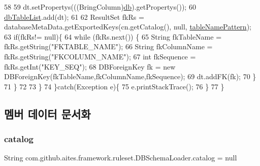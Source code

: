 \begin{DoxyCode}
58           
59                   dt.setPropertys(((BringColumn)\mbox{\hyperlink{classcom_1_1github_1_1aites_1_1framework_1_1ruleset_1_1_d_b_schema_loader_a2a610ebcfca7102369293e6728d0e9e2}{db}}).getPropertys());      
60                   \mbox{\hyperlink{classcom_1_1github_1_1aites_1_1framework_1_1ruleset_1_1_d_b_schema_loader_acacde0e67bd33c28127d235e7fb8aebf}{dbTableList}}.add(dt);
61                   
62                   ResultSet fkRs = databaseMetaData.getExportedKeys(cn.getCatalog(), null, 
      \mbox{\hyperlink{classcom_1_1github_1_1aites_1_1framework_1_1ruleset_1_1_d_b_schema_loader_a8f8b9bb76c0822247353f8e100f28a31}{tableNamePattern}});
63                   \textcolor{keywordflow}{if}(fkRs!= null)\{
64                       \textcolor{keywordflow}{while} (fkRs.next()) \{
65                           String fkTableName = fkRs.getString(\textcolor{stringliteral}{"FKTABLE\_NAME"});
66                           String fkColumnName = fkRs.getString(\textcolor{stringliteral}{"FKCOLUMN\_NAME"});
67                           \textcolor{keywordtype}{int} fkSequence = fkRs.getInt(\textcolor{stringliteral}{"KEY\_SEQ"});
68                           DBForeignKey fk = \textcolor{keyword}{new} DBForeignKey(fkTableName,fkColumnName,fkSequence);
69                           dt.addFK(fk);
70                       \}
71                   \}
72                                          
73               \}
74         \}\textcolor{keywordflow}{catch}(Exception e)\{
75             e.printStackTrace();
76         \}
77     \}
\end{DoxyCode}


\subsection{멤버 데이터 문서화}
\mbox{\label{classcom_1_1github_1_1aites_1_1framework_1_1ruleset_1_1_d_b_schema_loader_a78610ecd443794c2705a60e645c07e08}} 
\subsubsection{\texorpdfstring{catalog}{catalog}}
{\footnotesize\ttfamily String com.\+github.\+aites.\+framework.\+ruleset.\+D\+B\+Schema\+Loader.\+catalog = null\hspace{0.3cm}{\ttfamily [private]}}



